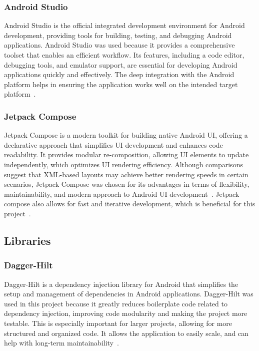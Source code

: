\subsubsection{Android Studio}
\label{sec:androidstudio}
Android Studio is the official integrated development environment for Android development, providing tools for building, testing, and debugging Android applications. Android Studio was used because it provides a comprehensive toolset that enables an efficient workflow. Its features, including a code editor, debugging tools, and emulator support, are essential for developing Android applications quickly and effectively. The deep integration with the Android platform helps in ensuring the application works well on the intended target platform~\cite{bib:androidstudio}.

\subsubsection{Jetpack Compose}
\label{sec:jetpackcompose}
Jetpack Compose is a modern toolkit for building native Android UI, offering a declarative approach that simplifies UI development and enhances code readability. It provides modular re-composition, allowing UI elements to update independently, which optimizes UI rendering efficiency. Although comparisons suggest that XML-based layouts may achieve better rendering speeds in certain scenarios, Jetpack Compose was chosen for its advantages in terms of flexibility, maintainability, and modern approach to Android UI development~\cite{bib:diva}. Jetpack compose also allows for fast and iterative development, which is beneficial for this project~\cite{bib:jetpackcompose}.

\subsection{Libraries}

\subsubsection{Dagger-Hilt}
\label{sec:daggerhilt}
Dagger-Hilt is a dependency injection library for Android that simplifies the setup and management of dependencies in Android applications. Dagger-Hilt was used in this project because it greatly reduces boilerplate code related to dependency injection, improving code modularity and making the project more testable. This is especially important for larger projects, allowing for more structured and organized code. It allows the application to easily scale, and can help with long-term maintainability~\cite{bib:daggerhilt}.

